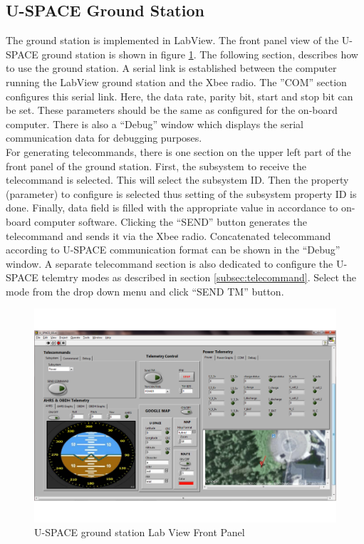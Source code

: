 \subsection{U-SPACE Ground Station}
The ground station is implemented in LabView. The front panel view of the \ac{U-SPACE} ground station is shown in figure \ref{fig:Labview_ground_station}. The following section, describes how to use the ground station. A serial link is established between the computer running the LabView ground station and the Xbee radio. The ''COM'' section configures this serial link. Here, the data rate, parity bit, start and stop bit can be set. These parameters should be the same as configured for the on-board computer. There is also a ``Debug'' window which displays the serial communication data for debugging purposes. \\
%
For generating telecommands, there is one section on the upper left part of the front panel of the ground station. First, the subsystem to receive the telecommand is selected. This will select the subsystem ID. Then the property (parameter) to configure is selected thus setting of the subsystem property ID is done. Finally, data field is filled with the appropriate value in accordance to on-board computer software. Clicking the ``SEND'' button generates the telecommand and sends it via the Xbee radio. Concatenated telecommand according to \ac{U-SPACE} communication format can be shown in the ``Debug'' window. A separate telecommand section is also dedicated to configure the \ac{U-SPACE} telemtry modes as described in section \ref{subsec:telecommand}. Select the mode from the drop down menu and click ``SEND TM'' button.
\\
\begin{figure}[bht]
\centering
\includegraphics[scale=0.5]{figures/GS.pdf}
\caption{U-SPACE ground station Lab View Front Panel}
\label{fig:Labview_ground_station}
\end{figure}
